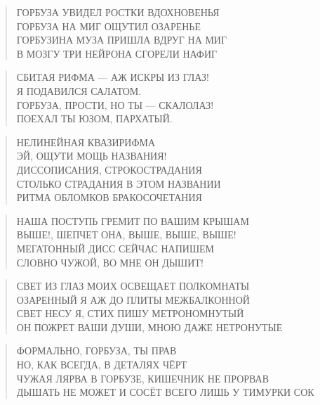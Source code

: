 \poemtitle{***}
\begin{verse}
ГОРБУЗА УВИДЕЛ РОСТКИ ВДОХНОВЕНЬЯ\\
ГОРБУЗА НА МИГ ОЩУТИЛ ОЗАРЕНЬЕ\\
ГОРБУЗИНА МУЗА ПРИШЛА ВДРУГ НА МИГ\\
В МОЗГУ ТРИ НЕЙРОНА СГОРЕЛИ НАФИГ
\end{verse}

\poemtitle{***}
\begin{verse}
СБИТАЯ РИФМА — АЖ ИСКРЫ ИЗ ГЛАЗ!\\
Я ПОДАВИЛСЯ САЛАТОМ.\\
ГОРБУЗА, ПРОСТИ, НО ТЫ — СКАЛОЛАЗ!\\
ПОЕХАЛ ТЫ ЮЗОМ, ПАРХАТЫЙ.
\end{verse}

\poemtitle{***}
\begin{verse}
НЕЛИНЕЙНАЯ КВАЗИРИФМА\\
ЭЙ, ОЩУТИ МОЩЬ НАЗВАНИЯ!\\
ДИССОПИСАНИЯ, СТРОКОСТРАДАНИЯ\\
СТОЛЬКО СТРАДАНИЯ В ЭТОМ НАЗВАНИИ\\
РИТМА ОБЛОМКОВ БРАКОСОЧЕТАНИЯ
\end{verse}

\poemtitle{***}
\begin{verse}
НАША ПОСТУПЬ ГРЕМИТ ПО ВАШИМ КРЫШАМ\\
ВЫШЕ!, ШЕПЧЕТ ОНА, ВЫШЕ, ВЫШЕ, ВЫШЕ!\\
МЕГАТОННЫЙ ДИСС СЕЙЧАС НАПИШЕМ\\
СЛОВНО ЧУЖОЙ, ВО МНЕ ОН ДЫШИТ!
\end{verse}

\poemtitle{***}
\begin{verse}
СВЕТ ИЗ ГЛАЗ МОИХ ОСВЕЩАЕТ ПОЛКОМНАТЫ\\
ОЗАРЕННЫЙ Я АЖ ДО ПЛИТЫ МЕЖБАЛКОННОЙ\\
СВЕТ НЕСУ Я, СТИХ ПИШУ МЕТРОНОМНУТЫЙ\\
ОН ПОЖРЕТ ВАШИ ДУШИ, МНОЮ ДАЖЕ НЕТРОНУТЫЕ
\end{verse}

\poemtitle{***}
\begin{verse}
ФОРМАЛЬНО, ГОРБУЗА, ТЫ ПРАВ\\
НО, КАК ВСЕГДА, В ДЕТАЛЯХ ЧЁРТ\\
ЧУЖАЯ ЛЯРВА В ГОРБУЗЕ, КИШЕЧНИК НЕ ПРОРВАВ\\
ДЫШАТЬ НЕ МОЖЕТ И СОСЁТ ВСЕГО ЛИШЬ У ТИМУРКИ СОК
\end{verse}

